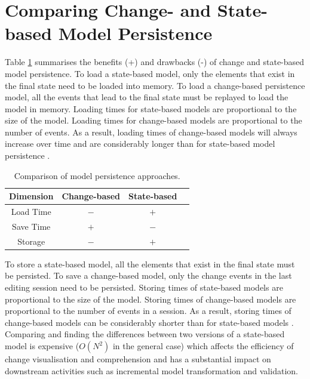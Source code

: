\section{Comparing Change- and State-based Model Persistence}
\label{sec:change_and_state_based_model_persistence}
Table \ref{table:persistence_comparison} summarises the benefits (+) and drawbacks (-) of change and state-based model persistence. To load a state-based model, only the elements that exist in the final state need to be loaded into memory. To load a change-based persistence model, all the events that lead to the final state must be replayed to load the model in memory. Loading times for state-based models are proportional to the size of the model. Loading times for change-based models are proportional to the number of events. As a result, loading times of change-based models will always increase over time and are considerably longer than for state-based model persistence \cite{yohannis2018towards, mens2002state}.

\begin{table}[ht]
  \caption{Comparison of model persistence approaches.}
  \label{table:persistence_comparison}
  \centering
  \begin{small}
    \begin{tabular}{ c c c c }
      \hline
      \textbf{Dimension} & \textbf{Change-based} & \textbf{State-based} \\
      \hline
      Load Time & $-$ & $+$ \\
      Save Time & $+$ & $-$ \\
      Storage & $-$ & $+$ \\
      \hline
    \end{tabular}
  \end{small}
\end{table}

To store a state-based model, all the elements that exist in the final state must be persisted. To save a change-based model, only the change events in the last editing session need to be persisted. Storing times of state-based models are proportional to the size of the model. Storing times of change-based models are proportional to the number of events in a session. As a result, storing times of change-based models can be considerably shorter than for state-based models \cite{yohannis2018towards}. Comparing and finding the differences between two versions of a state-based model is expensive \cite{Kolovos:2009:DMM:1564596.1564641} ($O(N^2)$ in the general case) which affects the efficiency of change visualisation and comprehension and has a substantial impact on downstream activities such as incremental model transformation \cite{DBLP:conf/ecmdafa/OgunyomiRK15} and validation.

